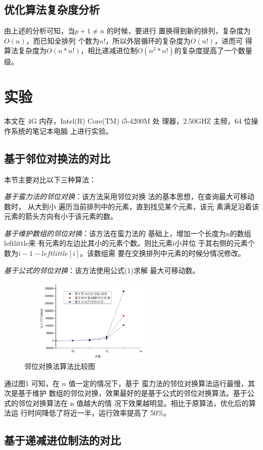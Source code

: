 \documentclass[6pt, twocolumn]{ctexart}
\begin{document}
\subsection{优化算法复杂度分析}
由上述的分析可知，当$p+1\ne n$ 的时候，要进行 置换得到新的排列，复杂度为$O(n)$，而已知全排列 个数为$n!$，所以外层循环的复杂度为$O(n!)$，进而可 得算法复杂度为$O(n * n!)$，相比递减进位制$O(n^2*n!)$的复杂度提高了一个数量级。
\section{实验}
本文在 4G 内存，Intel(R) Core(TM) i5-4200M 处 理器，2.50GHZ 主频，64 位操作系统的笔记本电脑 上进行实验。
\subsection{基于邻位对换法的对比}
本节主要对比以下三种算法：

\emph{基于蛮力法的邻位对换}：该方法采用邻位对换 法的基本思想，在查询最大可移动数时， 从大到小 遍历当前排列中的元素，直到找见某个元素，该元 素满足沿着该元素的箭头方向有小于该元素的数。

\emph{基于维护数组的邻位对换}：该方法在蛮力法的 基础上，增加一个长度为n的数组leftlittle来 有元素的左边比其小的元素个数。则比元素i小并位 于其右侧的元素个数为$i-1-leftlittle[i]$。该数组需 要在交换排列中元素的时候分情况修改。

\emph{基于公式的邻位对换}：该方法使用公式(1)求解 最大可移动数。
\begin{figure}
\centering	

\caption{邻位对换法算法比较图}
\includegraphics[width=7cm, height=4cm]{1.png}	
\end{figure}

通过图1 可知，在 $n$ 值一定的情况下，基于 蛮力法的邻位对换算法运行最慢，其次是基于维护 数组的邻位对换，效果最好的是基于公式的邻位对换算法。基于公式的邻位对换算法在 n 值越大的情 况下效果越明显。相比于原算法，优化后的算法运 行时间降低了将近一半，运行效率提高了 50\%。
\subsection{基于递减进位制法的对比}
\end{document}
